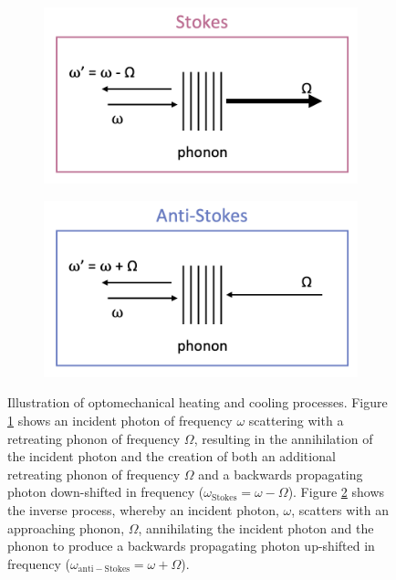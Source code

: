 \begin{figure}[t]
    \centering
    \begin{subfigure}[b]{0.49\textwidth}
        \centering
        \includegraphics[width=\textwidth]{figs/3-Cooling/StokesHeatingProcess.png}
        \caption{}
        \label{fig:Cooling:StokesHeating}
    \end{subfigure}
    \hfill
    \begin{subfigure}[b]{0.49\textwidth}
        \centering
        \includegraphics[width=\textwidth]{figs/3-Cooling/anti-StokesCoolingProcess.png}
        \caption{}
        \label{fig:Cooling:anti-StokesCooling}
    \end{subfigure}
    \caption{Illustration of optomechanical heating and cooling processes. Figure \ref{fig:Cooling:StokesHeating} shows an incident photon of frequency \(\omega\) scattering with a retreating phonon of frequency \(\Omega\), resulting in the annihilation of the incident photon and the creation of both an additional retreating phonon of frequency \(\Omega\) and a backwards propagating photon down-shifted in frequency (\(\omega_{\mathrm{Stokes}} = \omega - \Omega\)). Figure \ref{fig:Cooling:anti-StokesCooling} shows the inverse process, whereby an incident photon, \(\omega\), scatters with an approaching phonon, \(\Omega\), annihilating the incident photon and the phonon to produce a backwards propagating photon up-shifted in frequency (\(\omega_{\mathrm{anti-Stokes}} = \omega + \Omega\)).}
    \label{fig:Cooling:StokesProcesses}
\end{figure}


